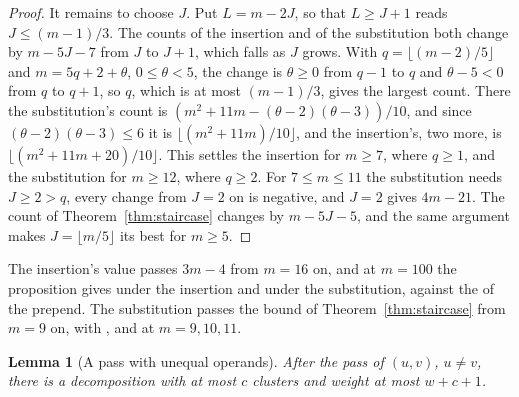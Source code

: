 \documentclass[11pt,a4paper]{article}
\theoremstyle{definition}
\theoremstyle{plain}
\newtheorem{lemma}{Lemma}
\begin{document}
\begin{proof}
It remains to choose \(J\). Put \(L = m - 2J\), so that \(L \ge J + 1\) reads \(J \le (m - 1)/3\). The counts of the
insertion and of the substitution both change by \(m - 5J - 7\) from \(J\) to \(J + 1\), which falls as \(J\) grows.
With \(q = \lfloor (m - 2)/5 \rfloor\) and \(m = 5q + 2 + \theta\), \(0 \le \theta < 5\), the change is \(\theta \ge 0\)
from \(q - 1\) to \(q\) and \(\theta - 5 < 0\) from \(q\) to \(q + 1\), so \(q\), which is at most \((m - 1)/3\), gives
the largest count. There the substitution's count is \((m^2 + 11m - (\theta - 2)(\theta - 3))/10\), and since
\((\theta - 2)(\theta - 3) \le 6\) it is \(\lfloor (m^2 + 11m)/10 \rfloor\), and the insertion's, two more, is
\(\lfloor (m^2 + 11m + 20)/10 \rfloor\). This settles the insertion for \(m \ge 7\), where \(q \ge 1\), and the
substitution for \(m \ge 12\), where \(q \ge 2\). For \(7 \le m \le 11\) the substitution needs \(J \ge 2 > q\), every
change from \(J = 2\) on is negative, and \(J = 2\) gives \(4m - 21\). The count of Theorem~\ref{thm:staircase} changes
by \(m - 5J - 5\), and the same argument makes \(J = \lfloor m/5 \rfloor\) its best for \(m \ge 5\).
\end{proof}

The insertion's value passes \(3m - 4\) from \(m = 16\) on, and at \(m = 100\) the proposition gives
\StaircaseInsertHundred{} under the insertion and \StaircaseSubHundred{} under the substitution, against the
\StaircaseHundred{} of the prepend. The substitution passes the bound of Theorem~\ref{thm:staircase} from \(m = 9\) on,
with \StaircaseSubNine{}, \StaircaseSubTen{} and \StaircaseSubEleven{} at \(m = 9, 10, 11\).


\begin{lemma}[A pass with unequal operands]\label{lem:passunequal}
After the pass of \((u, v)\), \(u \ne v\), there is a decomposition with at most \(c\) clusters and weight at most
\(w + c + 1\).
\end{lemma}
\end{document}
